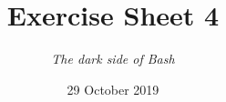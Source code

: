 




\title{{\vspace{-12mm}\huge\textbf{Exercise Sheet 4}}}
\author{\textit{The dark side of Bash}}
\date{{\small 29 October 2019}}


    \maketitle
    \bigskip
    
    \bigskip
    
    \bigskip
    
    \bigskip
    
